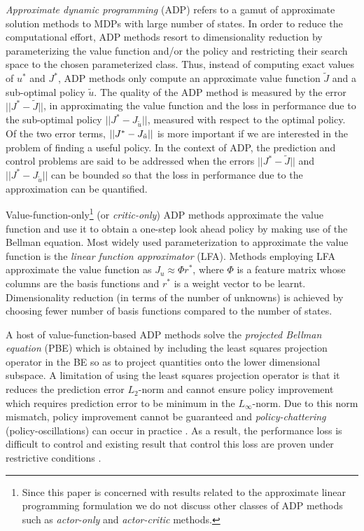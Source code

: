 \emph{Approximate dynamic programming} (ADP) \cite{dpchapter,powell} refers to a gamut of approximate solution methods to MDPs with large number of states. In order to reduce the computational effort, ADP methods resort to dimensionality reduction by parameterizing the value function and/or the policy and restricting their search space to the chosen parameterized class. Thus, instead of computing exact values of $u^*$ and $J^*$, ADP methods only compute an approximate value function $\tilde{J}$ and a sub-optimal policy $\tilde{u}$. The quality of the ADP method is measured by the error $||J^*-\tilde{J}||$, in approximating the value function and the loss in performance due to the sub-optimal policy $||J^*-J_{\tilde{u}}||$, measured with respect to the optimal policy. Of the two error terms, $||J^*-J_{\tilde{u}}||$ is more important if we are interested in the problem of finding a useful policy. In the context of ADP, the prediction and control problems are said to be addressed when the errors $||J^*-\tilde{J}||$ and $||J^*-J_{\tilde{u}}||$ can be bounded so that the loss in performance due to the approximation can be quantified.

Value-function-only\footnote{Since this paper is concerned with results related to the approximate linear programming formulation we do not discuss other classes of ADP methods such as \emph{actor-only} and \emph{actor-critic} methods.} (or \emph{critic-only}) ADP methods approximate the value function and use it to obtain a one-step look ahead policy by making use of the Bellman equation. Most widely used parameterization to approximate the value function is the \emph{linear function approximator} (LFA). Methods employing LFA approximate the value function as $J_u\approx\Phi r^*$, where $\Phi$ is a feature matrix whose columns are the basis functions and $r^*$ is a weight vector to be learnt. Dimensionality reduction (in terms of the number of unknowns) is achieved by choosing fewer number of basis functions compared to the number of states.

A host of value-function-based ADP methods solve the \emph{projected Bellman equation} (PBE) which is obtained by including the least squares projection operator in the BE so as to project quantities onto the lower dimensional subspace. A limitation of using the least squares projection operator is that it reduces the prediction error $L_2$-norm and cannot ensure policy improvement which requires prediction error to be minimum in the $L_\infty$-norm. Due to this norm mismatch, policy improvement cannot be guaranteed and \emph{policy-chattering} (policy-oscillations) can occur in practice \cite{dpchapter}. 
As a result, the performance loss is difficult to control and existing result that control this loss are proven under restrictive conditions \cite[e.g.,][]{anszemu:mlj07,FaMuSz10}.

